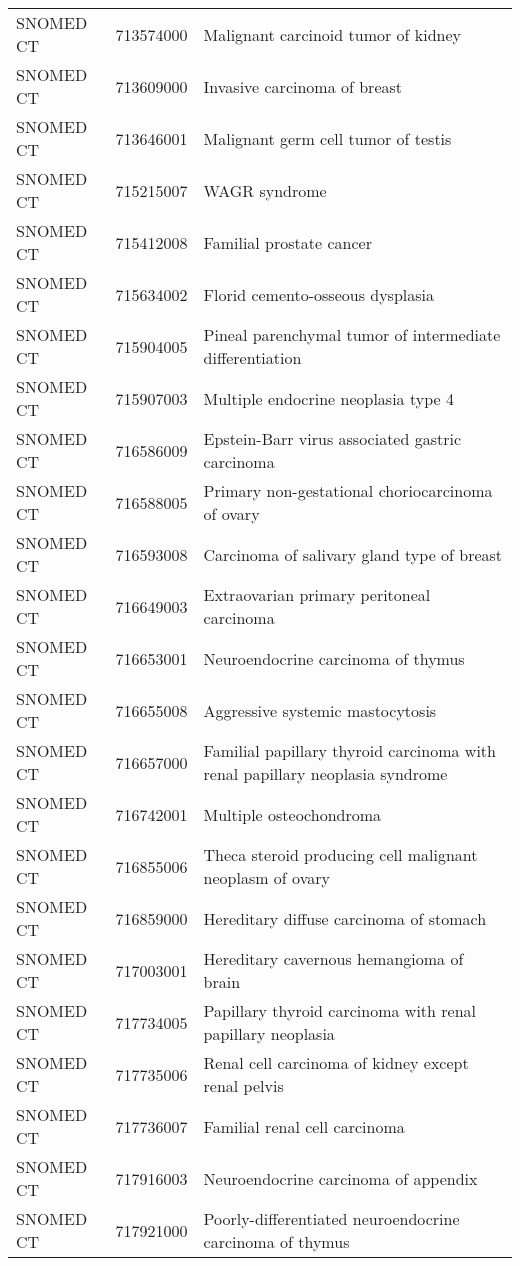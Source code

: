 \begin{longtable}{p{}p{}p{}}
  SNOMED CT & 713574000 & Malignant carcinoid tumor of kidney \\ 
  SNOMED CT & 713609000 & Invasive carcinoma of breast \\ 
  SNOMED CT & 713646001 & Malignant germ cell tumor of testis \\ 
  SNOMED CT & 715215007 & WAGR syndrome \\ 
  SNOMED CT & 715412008 & Familial prostate cancer \\ 
  SNOMED CT & 715634002 & Florid cemento-osseous dysplasia \\ 
  SNOMED CT & 715904005 & Pineal parenchymal tumor of intermediate differentiation \\ 
  SNOMED CT & 715907003 & Multiple endocrine neoplasia type 4 \\ 
  SNOMED CT & 716586009 & Epstein-Barr virus associated gastric carcinoma \\ 
  SNOMED CT & 716588005 & Primary non-gestational choriocarcinoma of ovary \\ 
  SNOMED CT & 716593008 & Carcinoma of salivary gland type of breast \\ 
  SNOMED CT & 716649003 & Extraovarian primary peritoneal carcinoma \\ 
  SNOMED CT & 716653001 & Neuroendocrine carcinoma of thymus \\ 
  SNOMED CT & 716655008 & Aggressive systemic mastocytosis \\ 
  SNOMED CT & 716657000 & Familial papillary thyroid carcinoma with renal papillary neoplasia syndrome \\ 
  SNOMED CT & 716742001 & Multiple osteochondroma \\ 
  SNOMED CT & 716855006 & Theca steroid producing cell malignant neoplasm of ovary \\ 
  SNOMED CT & 716859000 & Hereditary diffuse carcinoma of stomach \\ 
  SNOMED CT & 717003001 & Hereditary cavernous hemangioma of brain \\ 
  SNOMED CT & 717734005 & Papillary thyroid carcinoma with renal papillary neoplasia \\ 
  SNOMED CT & 717735006 & Renal cell carcinoma of kidney except renal pelvis \\ 
  SNOMED CT & 717736007 & Familial renal cell carcinoma \\ 
  SNOMED CT & 717916003 & Neuroendocrine carcinoma of appendix \\ 
  SNOMED CT & 717921000 & Poorly-differentiated neuroendocrine carcinoma of thymus \\ 

\end{longtable}
